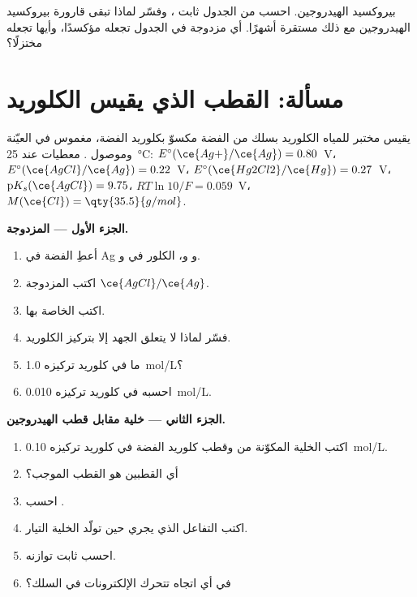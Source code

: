 \begin{exercise}[$\star\star\star$]\label{exo:b1:nernst:12}
بيروكسيد الهيدروجين. احسب من الجدول ثابت
، وفسّر لماذا تبقى قارورة بيروكسيد الهيدروجين
مع ذلك مستقرة أشهرًا. أي مزدوجة في الجدول تجعله
مؤكسدًا، وأيها تجعله مختزلًا؟
\end{exercise}

\section{مسألة: القطب الذي يقيس الكلوريد}

\begin{problem}
\label{pb:b1:nernst:1}
يقيس مختبر للمياه الكلوريد بسلك من الفضة مكسوّ بكلوريد
الفضة، مغموس في العيّنة وموصول .
معطيات عند \qty{25}{\celsius}: $E^\circ(\ce{Ag+}/\ce{Ag}) = 0.80$~V،
$E^\circ(\ce{AgCl}/\ce{Ag}) = 0.22$~V، $E^\circ(\ce{Hg2Cl2}/\ce{Hg}) =
0.27$~V، $\mathrm{p}K_s(\ce{AgCl}) = 9.75$، $RT\ln 10/F = 0.059$~V،
$M(\ce{Cl}) = \qty{35.5}{g/mol}$.

\medskip
\noindent\textbf{الجزء الأول --- المزدوجة.}
\begin{enumerate}
  \item أعطِ  الفضة في Ag و و،
         الكلور في  و.
  \item اكتب  المزدوجة $\ce{AgCl}/\ce{Ag}$.
  \item اكتب  الخاصة بها.
  \item فسّر لماذا لا يتعلق الجهد إلا بتركيز
        الكلوريد.
  \item ما  في كلوريد تركيزه \qty{1.0}{mol/L}؟
  \item احسبه في كلوريد تركيزه \qty{0.010}{mol/L}.
\end{enumerate}

\medskip
\noindent\textbf{الجزء الثاني --- خلية مقابل قطب الهيدروجين.}
\begin{enumerate}[resume]
  \item اكتب الخلية المكوّنة من 
        وقطب كلوريد الفضة في كلوريد تركيزه \qty{0.10}{mol/L}.
  \item أي القطبين هو القطب الموجب؟
  \item احسب .
  \item اكتب التفاعل الذي يجري حين تولّد الخلية التيار.
  \item احسب ثابت توازنه.
  \item في أي اتجاه تتحرك الإلكترونات في السلك؟
\end{enumerate}


\end{problem}
